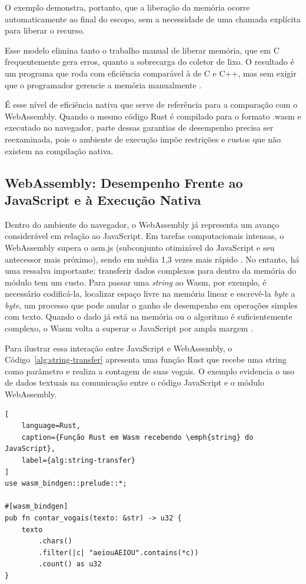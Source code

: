 O exemplo demonstra, portanto, que a liberação da memória ocorre automaticamente ao final do escopo, sem a necessidade de uma chamada explícita para liberar o recurso.

Esse modelo elimina tanto o trabalho manual de liberar memória, que em C frequentemente gera erros, quanto a sobrecarga do coletor de lixo. O resultado é um programa que roda com eficiência comparável à de C e C++, mas sem exigir que o programador gerencie a memória manualmente \cite{bugden2022}.

É esse nível de eficiência nativa que serve de referência para a comparação com o WebAssembly. Quando o mesmo código Rust é compilado para o formato .wasm e executado no navegador, parte dessas garantias de desempenho precisa ser reexaminada, pois o ambiente de execução impõe restrições e custos que não existem na compilação nativa.

\subsection{WebAssembly: Desempenho Frente ao JavaScript e à Execução Nativa}

Dentro do ambiente do navegador, o WebAssembly já representa um avanço considerável em relação ao JavaScript. Em tarefas computacionais intensas, o WebAssembly supera o asm.js (subconjunto otimizável do JavaScript e seu antecessor mais próximo), sendo em média 1,3 vezes mais rápido \cite{jangda2019}. No entanto, há uma ressalva importante: transferir dados complexos para dentro da memória do módulo tem um custo. Para passar uma \emph{string} ao Wasm, por exemplo, é necessário codificá-la, localizar espaço livre na memória linear e escrevê-la \emph{byte} a \emph{byte}, um processo que pode anular o ganho de desempenho em operações simples com texto. Quando o dado já está na memória ou o algoritmo é suficientemente complexo, o Wasm volta a superar o JavaScript por ampla margem \cite{moric2022}.

Para ilustrar essa interação entre JavaScript e WebAssembly, o Código~\ref{alg:string-transfer} apresenta uma função Rust que recebe uma string como parâmetro e realiza a contagem de suas vogais. O exemplo evidencia o uso de dados textuais na comunicação entre o código JavaScript e o módulo WebAssembly.

\begin{lstlisting}[
    language=Rust,
    caption={Função Rust em Wasm recebendo \emph{string} do JavaScript},
    label={alg:string-transfer}
]
use wasm_bindgen::prelude::*;

#[wasm_bindgen]
pub fn contar_vogais(texto: &str) -> u32 {
    texto
        .chars()
        .filter(|c| "aeiouAEIOU".contains(*c))
        .count() as u32
}
\end{lstlisting}

